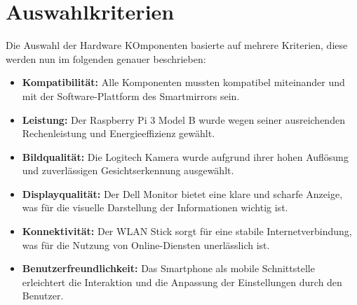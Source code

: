 \section{Auswahlkriterien}
Die Auswahl der Hardware KOmponenten basierte auf mehrere Kriterien, diese werden nun im folgenden genauer beschrieben:
\begin{itemize}
    \item \textbf{Kompatibilität:} Alle Komponenten mussten kompatibel miteinander und mit der Software-Plattform des Smartmirrors sein.
    \item \textbf{Leistung:} Der Raspberry Pi 3 Model B wurde wegen seiner ausreichenden Rechenleistung und Energieeffizienz gewählt.
    \item \textbf{Bildqualität:} Die Logitech Kamera wurde aufgrund ihrer hohen Auflösung und zuverlässigen Gesichtserkennung ausgewählt.
    \item \textbf{Displayqualität:} Der Dell Monitor bietet eine klare und scharfe Anzeige, was für die visuelle Darstellung der Informationen wichtig ist.
    \item \textbf{Konnektivität:} Der WLAN Stick sorgt für eine stabile Internetverbindung, was für die Nutzung von Online-Diensten unerlässlich ist.
    \item \textbf{Benutzerfreundlichkeit:} Das Smartphone als mobile Schnittstelle erleichtert die Interaktion und die Anpassung der Einstellungen durch den Benutzer.
\end{itemize}
